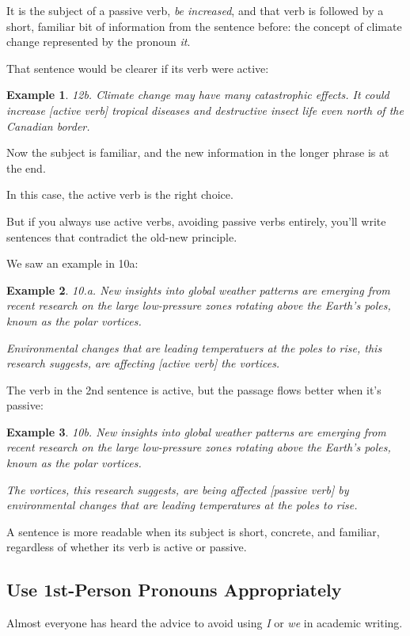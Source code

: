 \documentclass[oneside]{book}
\numberwithin{equation}{section}
\newtheorem{example}{Example}[section]
\begin{document}
It is the subject of a passive verb, \textit{be increased}, and that verb is followed by a short, familiar bit of information from the sentence before: the concept of climate change represented by the pronoun \textit{it}.

That sentence would be clearer if its verb were active:
\begin{example}
    12b. Climate change may have many catastrophic effects. It could increase \emph{[active verb]} tropical diseases and destructive insect life even north of the Canadian border.
\end{example}
Now the subject is familiar, and the new information in the longer phrase is at the end.

In this case, the active verb is the right choice.

%
But if you always use active verbs, avoiding passive verbs entirely, you'll write sentences that contradict the old-new principle.

We saw an example in 10a:
\begin{example}
    10.a. New insights into global weather patterns are emerging from recent research on the large low-pressure zones rotating above the Earth's poles, known as the polar vortices.
    
    Environmental changes that are leading temperatuers at the poles to rise, this research suggests, are affecting \emph{[active verb]} the vortices.
\end{example}
The verb in the 2nd sentence is active, but the passage flows better when it's passive:
\begin{example}
    10b. New insights into global weather patterns are emerging from recent research on the large low-pressure zones rotating above the Earth's poles, known as the polar vortices.
    
    The vortices, this research suggests, are being affected \emph{[passive verb]} by environmental changes that are leading temperatures at the poles to rise.
\end{example}
A sentence is more readable when its subject is short, concrete, and familiar, regardless of whether its verb is active or passive.


\subsection{Use 1st-Person Pronouns Appropriately}
Almost everyone has heard the advice to avoid using \textit{I} or \textit{we} in academic writing.
\end{document}
